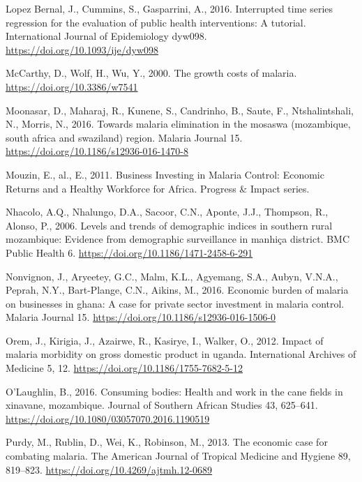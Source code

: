 \documentclass[]{article}
\begin{document}
\hypertarget{ref-Lopez_Bernal_2016}{}
Lopez Bernal, J., Cummins, S., Gasparrini, A., 2016. Interrupted time
series regression for the evaluation of public health interventions: A
tutorial. International Journal of Epidemiology dyw098.
\url{https://doi.org/10.1093/ije/dyw098}

\hypertarget{ref-McCarthy_2000}{}
McCarthy, D., Wolf, H., Wu, Y., 2000. The growth costs of malaria.
\url{https://doi.org/10.3386/w7541}

\hypertarget{ref-Moonasar_2016}{}
Moonasar, D., Maharaj, R., Kunene, S., Candrinho, B., Saute, F.,
Ntshalintshali, N., Morris, N., 2016. Towards malaria elimination in the
mosaswa (mozambique, south africa and swaziland) region. Malaria Journal
15. \url{https://doi.org/10.1186/s12936-016-1470-8}

\hypertarget{ref-Mouzin2011}{}
Mouzin, E., al., E., 2011. Business Investing in Malaria Control:
Economic Returns and a Healthy Workforce for Africa. Progress \& Impact
series.

\hypertarget{ref-Nhacolo_2006}{}
Nhacolo, A.Q., Nhalungo, D.A., Sacoor, C.N., Aponte, J.J., Thompson, R.,
Alonso, P., 2006. Levels and trends of demographic indices in southern
rural mozambique: Evidence from demographic surveillance in manhiça
district. BMC Public Health 6.
\url{https://doi.org/10.1186/1471-2458-6-291}

\hypertarget{ref-Nonvignon_2016}{}
Nonvignon, J., Aryeetey, G.C., Malm, K.L., Agyemang, S.A., Aubyn,
V.N.A., Peprah, N.Y., Bart-Plange, C.N., Aikins, M., 2016. Economic
burden of malaria on businesses in ghana: A case for private sector
investment in malaria control. Malaria Journal 15.
\url{https://doi.org/10.1186/s12936-016-1506-0}

\hypertarget{ref-Orem_2012}{}
Orem, J., Kirigia, J., Azairwe, R., Kasirye, I., Walker, O., 2012.
Impact of malaria morbidity on gross domestic product in uganda.
International Archives of Medicine 5, 12.
\url{https://doi.org/10.1186/1755-7682-5-12}

\hypertarget{ref-OLaughlin2016}{}
O'Laughlin, B., 2016. Consuming bodies: Health and work in the cane
fields in xinavane, mozambique. Journal of Southern African Studies 43,
625--641. \url{https://doi.org/10.1080/03057070.2016.1190519}

\hypertarget{ref-Purdy_2013}{}
Purdy, M., Rublin, D., Wei, K., Robinson, M., 2013. The economic case
for combating malaria. The American Journal of Tropical Medicine and
Hygiene 89, 819--823. \url{https://doi.org/10.4269/ajtmh.12-0689}
\end{document}
